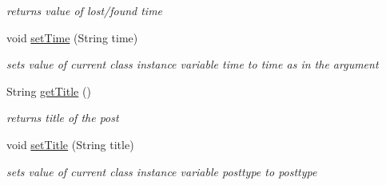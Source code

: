 \begin{DoxyCompactItemize}
\begin{DoxyCompactList}\small\item\em returns value of lost/found time \end{DoxyCompactList}\item 
void \hyperlink{classcom_1_1example_1_1sel_1_1lostfound_1_1Posts_aad0eb829e3012993f0c65be755026688}{set\-Time} (\-String time)
\begin{DoxyCompactList}\small\item\em sets value of current class instance variable time to time as in the argument \end{DoxyCompactList}\item 
\hypertarget{classcom_1_1example_1_1sel_1_1lostfound_1_1Posts_a09ebe434b5050ffd1169ada4b6d3f5b4}{\-String \hyperlink{classcom_1_1example_1_1sel_1_1lostfound_1_1Posts_a09ebe434b5050ffd1169ada4b6d3f5b4}{get\-Title} ()}\label{classcom_1_1example_1_1sel_1_1lostfound_1_1Posts_a09ebe434b5050ffd1169ada4b6d3f5b4}

\begin{DoxyCompactList}\small\item\em returns title of the post \end{DoxyCompactList}\item 
void \hyperlink{classcom_1_1example_1_1sel_1_1lostfound_1_1Posts_a65ddfd89f1ecc7fd7280429d61856b40}{set\-Title} (\-String title)
\begin{DoxyCompactList}\small\item\em sets value of current class instance variable posttype to posttype \end{DoxyCompactList}\end{DoxyCompactItemize}


